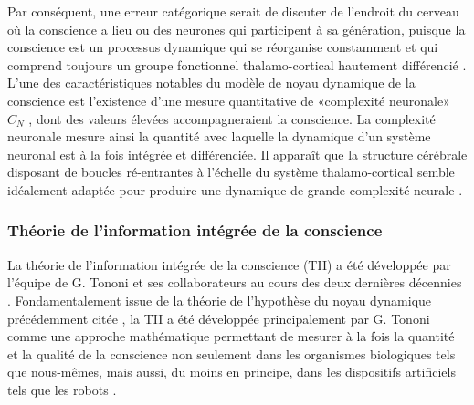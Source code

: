 Par conséquent, une erreur catégorique serait de discuter de l'endroit du cerveau où la conscience a lieu ou des neurones qui participent à sa génération, puisque la conscience est un processus dynamique qui se réorganise constamment et qui comprend toujours un groupe fonctionnel thalamo-cortical hautement différencié \citep{edelman2000reentry, edelman2003naturalizing, tagliazucchi2013sleep, tononi1998consciousness}.
L'une des caractéristiques notables du modèle de noyau dynamique de la conscience est l'existence d'une mesure quantitative de «complexité neuronale» $C_N$ \citep{tononi1994measure}, dont des valeurs élevées accompagneraient la conscience. 
La complexité neuronale mesure ainsi la quantité avec laquelle la dynamique d'un système neuronal est à la fois intégrée et différenciée. 
Il apparaît que la structure cérébrale disposant de boucles ré-entrantes à l'échelle du système thalamo-cortical semble idéalement adaptée pour produire une dynamique de grande complexité neurale \citep{sporns2000connectivity, sporns2000theoretical}.

\subsubsection{Théorie de l'information intégrée de la conscience}
\label{theorieinformationintegree}

La théorie de l'information intégrée de la conscience (TII) a été développée par l'équipe de G. Tononi et ses collaborateurs au cours des deux dernières décennies \citep{balduzzi2008integrated, tononi2003measuring, tononi2004information, tononi2011integrated, tononi2016integrated, oizumi2014phenomenology}. 
Fondamentalement issue de la théorie de l'hypothèse du noyau dynamique précédemment citée \citep{edelman2000reentry, tononi1998consciousness}, la TII a été développée principalement par G. Tononi comme une approche mathématique permettant de mesurer à la fois la quantité et la qualité de la conscience non seulement dans les organismes biologiques tels que nous-mêmes, mais aussi, du moins en principe, dans les dispositifs artificiels tels que les robots \citep{oizumi2014phenomenology, tononi2004information, tononi2008consciousness, tononi2012integrated, tononi2015consciousness}. 

